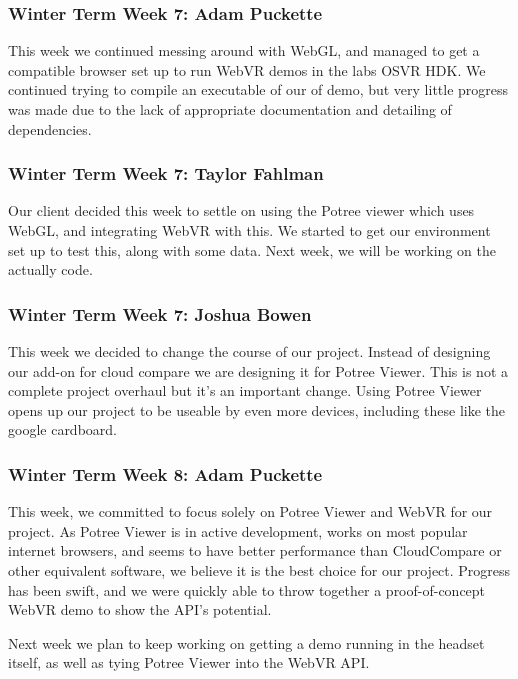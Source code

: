 \documentclass[draftclsnofoot,onecolumn]{IEEEtran}
\begin{document}
\subsubsection{Winter Term Week 7: Adam Puckette}

This week we continued messing around with WebGL, and managed to get a compatible browser set up to run WebVR demos in the labs OSVR HDK. We continued trying to compile an executable of our of demo, but very little progress was made due to the lack of appropriate documentation and detailing of dependencies.

\subsubsection{Winter Term Week 7: Taylor Fahlman}

Our client decided this week to settle on using the Potree viewer which uses WebGL, and integrating WebVR with this. We started to get our environment set up to test this, along with some data. Next week, we will be working on the actually code.

\subsubsection{Winter Term Week 7: Joshua Bowen}

This week we decided to change the course of our project. Instead of designing our add-on for cloud compare we are designing it for Potree Viewer. This is not a complete project overhaul but it's an important change. Using Potree Viewer opens up our project to be useable by even more devices, including these like the google cardboard.

\subsubsection{Winter Term Week 8: Adam Puckette}

This week, we committed to focus solely on Potree Viewer and WebVR for our project. As Potree Viewer is in active development, works on most popular internet browsers, and seems to have better performance than CloudCompare or other equivalent software, we believe it is the best choice for our project. Progress has been swift, and we were quickly able to throw together a proof-of-concept WebVR demo to show the API's potential.

Next week we plan to keep working on getting a demo running in the headset itself, as well as tying Potree Viewer into the WebVR API.
\end{document}
